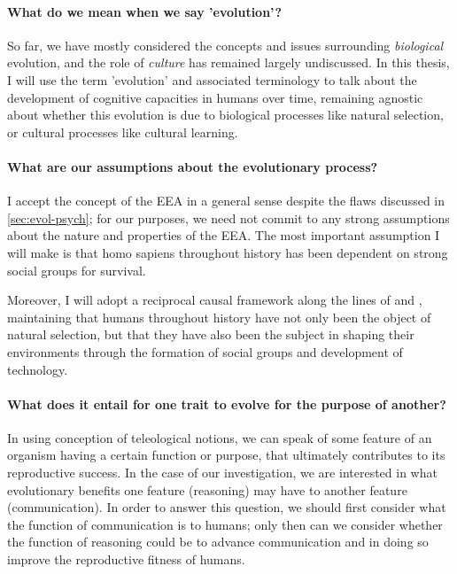 \paragraph{What do we mean when we say 'evolution'?}
So far, we have mostly considered the concepts and issues surrounding \emph{biological} evolution, and the role of \emph{culture} has remained largely undiscussed.
In this thesis, I will use the term 'evolution' and associated terminology to talk about the development of cognitive capacities in humans over time, remaining agnostic about whether this evolution is due to biological processes like natural selection, or cultural processes like cultural learning.

\paragraph{What are our assumptions about the evolutionary process?}
I accept the concept of the EEA in a general sense despite the flaws discussed in \cref{sec:evol-psych}; for our purposes, we need not commit to any strong assumptions about the nature and properties of the EEA. The most important assumption I will make is that homo sapiens throughout history has been dependent on strong social groups for survival.

Moreover, I will adopt a reciprocal causal framework along the lines of \citet{Laland13} and \citet{Svensson18}, maintaining that humans throughout history have not only been the object of natural selection, but that they have also been the subject in shaping their environments through the formation of social groups and development of technology.

\paragraph{What does it entail for one trait to evolve for the purpose of another?}
In using  conception of teleological notions, we can speak of some feature of an organism having a certain function or purpose, that ultimately contributes to its reproductive success. In the case of our investigation, we are interested in what evolutionary benefits one feature (reasoning) may have to another feature (communication). In order to answer this question, we should first consider what the function of communication is to humans; only then can we consider whether the function of reasoning could be to advance communication and in doing so improve the reproductive fitness of humans.

